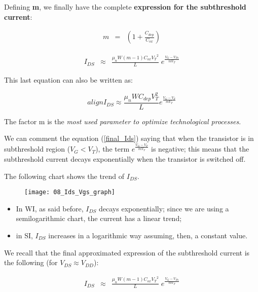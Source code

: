 \documentclass[a4paper, 12pt, twoside, openright]{report}
\begin{document}
Defining \textbf{m}, we finally have the complete \textbf{expression for the subthreshold current}:

    \begin{eqnarray*}
       {m}&=& \left(1 +\frac{C_{dep}}{C_{ox}}\right)
     \end{eqnarray*}

   \begin{eqnarray*}
    I_{DS}    &\approx & \frac{\mu_n W \left(m-1 \right) C_{ox} {V_T}^2}{L}\;
            e^{\displaystyle \frac{ {V_G-V_{Th}}}{ mV_T}} 
     \end{eqnarray*}

This last equation can also be written as:

\begin{equation*}[box=\fbox]{align}
I_{DS} \approx \frac{\mu_n W C_{dep} V_T^2}{L} e^{\frac{V_G - V_T}{m V_T}}
\label{final_Ids}
\end{equation*}

The factor m is the \emph{most used parameter to optimize technological processes}.

We can comment the equation (\ref{final_Ids}) saying that when the transistor is in subthreshold region ($V_G < V_T$), the term $e^{\frac{V_G - V_T}{m V_T}}$ is negative; this means that the subthreshold current decays exponentially when the transistor is switched off.

The following chart shows the trend of $I_{DS}$.

	\begin{figure}[H]
	\centering
	\texttt{[image: 08\_Ids\_Vgs\_graph]}
	\caption{}
	\label{}
	\end{figure}

\begin{itemize}
\item In WI, as said before, $I_{DS}$ decays exponentially; since we are using a semilogarithmic chart, the current has a linear trend;
\item in SI,  $I_{DS}$ increases in a logarithmic way assuming, then, a constant value.
\end{itemize}


We recall that the final approximated expression of the subthreshold current is the following (for $V_{DS} \approx V_{DD}$):

   \begin{eqnarray*}
    I_{DS}    &\approx & \frac{\mu_n W \left(m-1 \right) C_{ox} {V_T}^2}{L}\;
            e^{\displaystyle \frac{ {V_G-V_{Th}}}{ mV_T}} 
     \end{eqnarray*}
\end{document}
